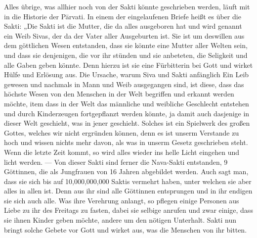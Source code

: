 \documentclass{article}
\begin{document}
Alles übrige, was allhier noch von der Sakti könnte geschrieben werden, läuft mit in die Historie der P\={a}rvati. In einem der eingelaufenen Briefe heißt es über die Sakti: „Die Sakti ist die Mutter, die da alles ausgeboren hat und wird genannt ein Weib Sivas, der da der Vater aller Ausgeburten ist. Sie ist um deswillen aus dem göttlichen Wesen entstanden, dass sie könnte eine Mutter aller Welten sein, und dass sie denjenigen, die vor ihr stünden und sie anbeteten, die Seligkeit und alle Gaben geben könnte. Denn hierzu ist sie eine Fürbitterin bei Gott und wirket Hülfe und Erlösung aus. Die Ursache, warum Siva und Sakti anfänglich Ein Leib gewesen und nachmals in Mann und Weib ausgegangen sind, ist diese, dass das höchste Wesen von den Menschen in der Welt begriffen und erkannt werden möchte, item dass in der Welt das männliche und weibliche Geschlecht entstehen und durch Kinderzeugen fortgepflanzt werden könnte, ja damit auch dasjenige in dieser Welt geschieht, was in jener geschieht. Solches ist ein Spielwerk des großen Gottes, welches wir nicht ergründen können, denn es ist unserm Verstande zu hoch und wissen nichts mehr davon, als was in unserm Gesetz geschrieben steht. Wenn die letzte Zeit kommt, so wird alles wieder ins helle Licht eingehen und licht werden. — Von dieser Sakti sind ferner die Nava-Sakti entstanden, 9 Göttinnen, die als Jungfrauen von 16 Jahren abgebildet werden. Auch sagt man, dass sie sich bis auf 10,000,000,000 Saktis vermehrt haben, unter welchen sie aber alles in allen ist. Denn aus ihr sind alle Göttinnen entsprungen und in ihr endigen sie sich auch alle. Was ihre Verehrung anlangt, so pflegen einige Personen aus Liebe zu ihr des Freitags zu fasten, dabei sie selbige anrufen und zwar einige, dass sie ihnen Kinder geben möchte, andere um den nötigen Unterhalt. Sakti nun bringt solche Gebete vor Gott und wirket aus, was die Menschen von ihr bitten.

\begin{center}
\end{center}
\end{document}
